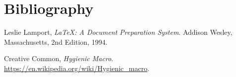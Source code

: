 


\section{Bibliography}
\begin{thebibliography}{99}

  Leslie Lamport,
  \emph{\LaTeX: A Document Preparation System}.
  Addison Wesley, Massachusetts,
  2nd Edition,
  1994.

  Creative Common,
  \emph{Hygienic Macro}.
  \url{https://en.wikipedia.org/wiki/Hygienic_macro}.

\end{thebibliography}